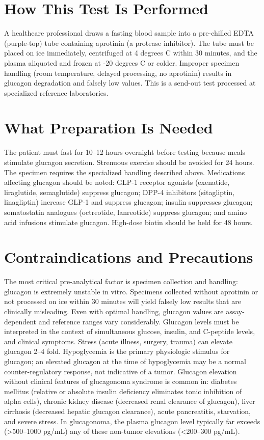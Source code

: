 \section*{How This Test Is Performed}
A healthcare professional draws a fasting blood sample into a pre-chilled EDTA (purple-top) tube containing aprotinin (a protease inhibitor). The tube must be placed on ice immediately, centrifuged at 4 degrees C within 30 minutes, and the plasma aliquoted and frozen at -20 degrees C or colder. Improper specimen handling (room temperature, delayed processing, no aprotinin) results in glucagon degradation and falsely low values. This is a send-out test processed at specialized reference laboratories.

\section*{What Preparation Is Needed}
The patient must fast for 10--12 hours overnight before testing because meals stimulate glucagon secretion. Strenuous exercise should be avoided for 24 hours. The specimen requires the specialized handling described above. Medications affecting glucagon should be noted: GLP-1 receptor agonists (exenatide, liraglutide, semaglutide) suppress glucagon; DPP-4 inhibitors (sitagliptin, linagliptin) increase GLP-1 and suppress glucagon; insulin suppresses glucagon; somatostatin analogues (octreotide, lanreotide) suppress glucagon; and amino acid infusions stimulate glucagon. High-dose biotin should be held for 48 hours.

\section*{Contraindications and Precautions}
The most critical pre-analytical factor is specimen collection and handling: glucagon is extremely unstable in vitro. Specimens collected without aprotinin or not processed on ice within 30 minutes will yield falsely low results that are clinically misleading. Even with optimal handling, glucagon values are assay-dependent and reference ranges vary considerably. Glucagon levels must be interpreted in the context of simultaneous glucose, insulin, and C-peptide levels, and clinical symptoms. Stress (acute illness, surgery, trauma) can elevate glucagon 2--4 fold. Hypoglycemia is the primary physiologic stimulus for glucagon; an elevated glucagon at the time of hypoglycemia may be a normal counter-regulatory response, not indicative of a tumor. Glucagon elevation without clinical features of glucagonoma syndrome is common in: diabetes mellitus (relative or absolute insulin deficiency eliminates tonic inhibition of alpha cells), chronic kidney disease (decreased renal clearance of glucagon), liver cirrhosis (decreased hepatic glucagon clearance), acute pancreatitis, starvation, and severe stress. In glucagonoma, the plasma glucagon level typically far exceeds (>500--1000 pg/mL) any of these non-tumor elevations (<200--300 pg/mL).

